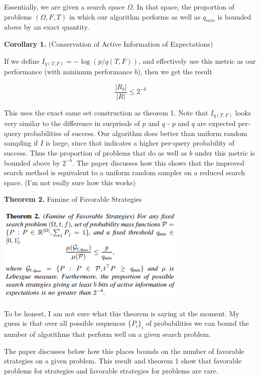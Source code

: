 \documentclass[12pt]{article}
\begin{document}
Essentially, we are given a search space $\Omega$. In that space, the proportion of problems $(\Omega, F, T)$ in which our algorithm performs as well as $q_{min}$ is bounded above by an exact quantity. 

\bigskip 

\textbf{Corollary 1.} (Conservation of Active Information of Expectations)

If we define $I_{q(T,F)} = - \log(p/q(T,F))$, and effectively use this metric as our performance (with minimum performance $b$), then we get the result 

\[\frac{|R_b|}{|R|} \leq 2^{-b}\]

This uses the exact same set construction as theorem 1. Note that $I_{q(T,F)}$ looks very similar to the difference in surprisals of $p$ and $q$ - $p$ and $q$ are expected per-query probabilities of success. Our algorithm does better than uniform random sampling if $I$ is large, since that indicates a higher per-query probability of success. Thus the proportion of problems that do as well as $b$ under this metric is bounded above by $2^{-b}$. The paper discusses how this shows that the improved search method is equivalent to a uniform random sampler on a reduced search space. (I'm not really sure how this works) 

\bigskip

\textbf{Theorem 2.} Famine of Favorable Strategies
\begin{center}
    \includegraphics{FamineForte/FamineStrategy.PNG}
\end{center}

To be honest, I am not sure what this theorem is saying at the moment. My guess is that over all possible sequences $\{P_i\}_i$ of probabilities we can bound the number of algorithms that perform well on a given search problem. 

The paper discusses below how this places bounds on the number of favorable strategies on a given problem. This result and theorem 1 show that favorable problems for strategies and favorable strategies for problems are rare. 
\end{document}
